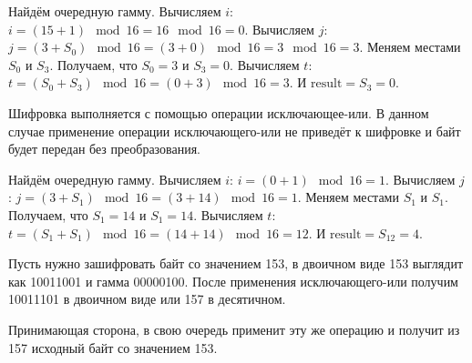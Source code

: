 \documentclass[10pt]{article}
\begin{document}
Найдём очередную гамму. Вычисляем $i$: $i = (15 + 1) \mod 16 = 16 \mod 16 = 0$. Вычисляем $j$: $j = (3 + S_0) \mod 16 = (3 + 0) \mod 16 = 3 \mod 16 = 3$. Меняем местами $S_0$ и $S_3$. Получаем, что $S_0 = 3$ и $S_3 = 0$. Вычисляем $t$: $t = (S_0 + S_3) \mod 16 = (0 + 3) \mod 16 = 3$. И $\text{result} = S_3 = 0$.

Шифровка выполняется с помощью операции исключающее-или. В данном случае применение операции исключающего-или не приведёт к шифровке и байт будет передан без преобразования.

Найдём очередную гамму. Вычисляем $i$: $i = (0 + 1) \mod 16 = 1$. Вычисляем $j$: $j = (3 + S_1) \mod 16 = (3 + 14) \mod 16 = 1$. Меняем местами $S_1$ и $S_1$. Получаем, что $S_1 = 14$ и $S_1 = 14$. Вычисляем $t$: $t = (S_1 + S_1) \mod 16 = (14 + 14) \mod 16 = 12$. И $\text{result} = S_{12} = 4$.

Пусть нужно зашифровать байт со значением 153, в двоичном виде 153 выглядит как 10011001 и гамма 00000100. После применения ис\-клю\-чаю\-щего-или получим 10011101 в двоичном виде или 157 в десятичном.

Принимающая сторона, в свою очередь применит эту же операцию и получит из 157 исходный байт со значением 153.
\end{document}
